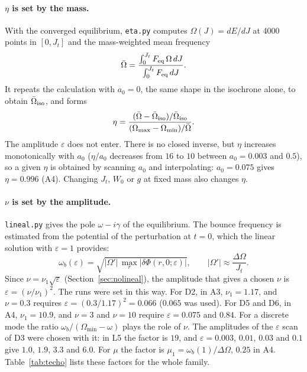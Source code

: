 \documentclass[11pt,a4paper]{article}
\begin{document}
\paragraph{$\eta$ is set by the mass.} With the converged equilibrium, \texttt{eta.py}
computes $\Omega(J)=dE/dJ$ at 4000 points in $[0,J_t]$ and the mass-weighted mean
frequency
\[
  \bar\Omega=\frac{\int_0^{J_t}F_{\rm eq}\,\Omega\,dJ}{\int_0^{J_t}F_{\rm eq}\,dJ} .
\]
It repeats the calculation with $a_0=0$, the same shape in the isochrone alone, to
obtain $\bar\Omega_{\rm iso}$, and forms
\[
  \eta=\frac{(\bar\Omega-\bar\Omega_{\rm iso})/\bar\Omega_{\rm iso}}{(\Omega_{\max}-\Omega_{\min})/\bar\Omega} .
\]
The amplitude $\varepsilon$ does not enter. There is no closed inverse, but $\eta$
increases monotonically with $a_0$ ($\eta/a_0$ decreases from $16$ to $10$ between
$a_0=0.003$ and $0.5$), so a given $\eta$ is obtained by scanning $a_0$ and
interpolating: $a_0=0.075$ gives $\eta=0.996$ (A4). Changing $J_t$, $W_0$ or $g$ at fixed
mass also changes $\eta$.

\paragraph{$\nu$ is set by the amplitude.} \texttt{lineal.py} gives the pole
$\omega-i\gamma$ of the equilibrium. The bounce frequency is estimated from the
potential of the perturbation at $t=0$, which the linear solution with $\varepsilon=1$
provides:
\[
  \omega_b(\varepsilon)=\sqrt{|\Omega'|\,\max_r|\delta\Phi(r,0;\varepsilon)|},\qquad |\Omega'|\approx\frac{\Delta\Omega}{J_t} .
\]
Since $\nu=\nu_1\sqrt\varepsilon$ (Section~\ref{sec:nolineal}), the amplitude that gives a
chosen $\nu$ is $\varepsilon=(\nu/\nu_1)^2$. The runs were set in this way. For D2, in
A3, $\nu_1=1.17$, and $\nu=0.3$ requires $\varepsilon=(0.3/1.17)^2=0.066$ ($0.065$ was used).
For D5 and D6, in A4, $\nu_1=10.9$, and $\nu=3$ and $\nu=10$ require $\varepsilon=0.075$ and
$0.84$. For a discrete mode the ratio $\omega_b/(\Omega_{\min}-\omega)$ plays the role of $\nu$. The
amplitudes of the $\varepsilon$ scan of D3 were chosen with it: in L5 the factor is
$19$, and $\varepsilon=0.003$, $0.01$, $0.03$ and $0.1$ give $1.0$, $1.9$, $3.3$ and $6.0$. For $\mu$
the factor is $\mu_1=\omega_b(1)/\Delta\Omega$, $0.25$ in A4. Table~\ref{tab:techo} lists these factors
for the whole family.
\end{document}
